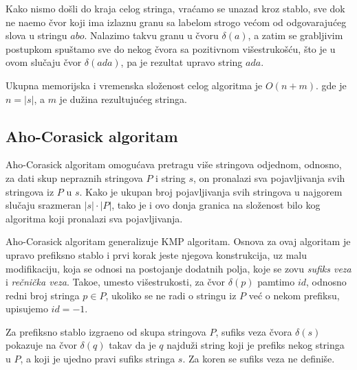 Kako nismo do\v sli do kraja celog stringa, vra\' camo se unazad kroz stablo, sve dok ne na\dj emo \v cvor koji ima izlaznu granu sa labelom strogo ve\' com od odgovaraju\' ceg slova u stringu $abo$. Nalazimo takvu granu u \v cvoru $\delta(a)$, a zatim se grabljivim postupkom spu\v stamo sve do nekog \v cvora sa pozitivnom vi\v sestruko\v s\' cu, \v sto je u ovom slu\v caju \v cvor $\delta(ada)$, pa je rezultat upravo string $ada$.

Ukupna memorijska i vremenska slo\v zenost celog algoritma je $O(n+m)$. gde je $n = |s|$, a $m$ je du\v zina rezultuju\' ceg stringa.

\subsection{Aho-Corasick algoritam}

Aho-Corasick algoritam omogu\' cava pretragu vi\v se stringova odjednom, odnosno, za dati skup nepraznih stringova $P$ i string $s$, on pronalazi sva pojavljivanja svih stringova iz $P$ u $s$. Kako je ukupan broj pojavljivanja svih stringova u najgorem slu\v caju srazmeran $|s|\cdot|P|$, tako je i ovo donja granica na slo\v zenost bilo kog algoritma koji pronalazi sva pojavljivanja.

Aho-Corasick algoritam generalizuje KMP algoritam. Osnova za ovaj algoritam je upravo prefiksno stablo i prvi korak jeste njegova konstrukcija, uz malu modifikaciju, koja se odnosi na postojanje dodatnih polja, koje se zovu \textit{sufiks veza} i \textit{re\v cni\v cka veza}. Tako\dj e, umesto vi\v sestrukosti, za \v cvor $\delta(p)$ pamtimo $id$, odnosno redni broj stringa $p \in P$, ukoliko se ne radi o stringu iz $P$ ve\' c o nekom prefiksu, upisujemo $id = -1$. 

\noindent
\begin{minipage}[l]{\textwidth}

\end{minipage}

\noindent
\begin{minipage}[l]{\textwidth}

\end{minipage}

\begin{dfn}
Za prefiksno stablo izgra\dj eno od skupa stringova $P$, sufiks veza \v cvora $\delta(s)$ pokazuje na \v cvor $\delta(q)$ takav da je $q$ najdu\v zi string koji je prefiks nekog stringa u $P$, a koji je ujedno pravi sufiks stringa $s$. Za koren se sufiks veza ne defini\v se.
\end{dfn}

